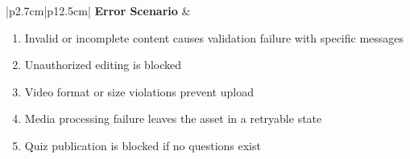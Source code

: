 \begin{table}[H]
\begin{tabular}{|p{2.7cm}|p{12.5cm}|}
        \hline
        \textbf{Error Scenario} & \begin{minipage}[t]{\linewidth}
            \begin{enumerate}[topsep=0pt,itemsep=1pt,parsep=0pt,partopsep=0pt]
                \item Invalid or incomplete content causes validation failure with specific messages
                \item Unauthorized editing is blocked
                \item Video format or size violations prevent upload
                \item Media processing failure leaves the asset in a retryable state
                \item Quiz publication is blocked if no questions exist
            \end{enumerate}
        \end{minipage} \\
        \hline
    \end{tabular}
    \label{tab:teacher-content}
\end{table}




